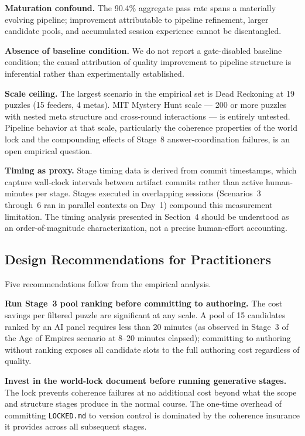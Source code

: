 \textbf{Maturation confound.} The 90.4\% aggregate pass rate spans a materially evolving pipeline; improvement attributable to pipeline refinement, larger candidate pools, and accumulated session experience cannot be disentangled.

\textbf{Absence of baseline condition.} We do not report a gate-disabled baseline condition; the causal attribution of quality improvement to pipeline structure is inferential rather than experimentally established.

\textbf{Scale ceiling.} The largest scenario in the empirical set is Dead Reckoning at 19 puzzles (15 feeders, 4 metas). MIT Mystery Hunt scale — 200 or more puzzles with nested meta structure and cross-round interactions — is entirely untested. Pipeline behavior at that scale, particularly the coherence properties of the world lock and the compounding effects of Stage~8 answer-coordination failures, is an open empirical question.

\textbf{Timing as proxy.} Stage timing data is derived from commit timestamps, which capture wall-clock intervals between artifact commits rather than active human-minutes per stage. Stages executed in overlapping sessions (Scenarios~3 through~6 ran in parallel contexts on Day~1) compound this measurement limitation. The timing analysis presented in Section~4 should be understood as an order-of-magnitude characterization, not a precise human-effort accounting.

\subsection{Design Recommendations for Practitioners}

Five recommendations follow from the empirical analysis.

\textbf{Run Stage~3 pool ranking before committing to authoring.} The cost savings per filtered puzzle are significant at any scale. A pool of 15 candidates ranked by an AI panel requires less than 20 minutes (as observed in Stage~3 of the Age of Empires scenario at 8–20 minutes elapsed); committing to authoring without ranking exposes all candidate slots to the full authoring cost regardless of quality.

\textbf{Invest in the world-lock document before running generative stages.} The lock prevents coherence failures at no additional cost beyond what the scope and structure stages produce in the normal course. The one-time overhead of committing \texttt{LOCKED.md} to version control is dominated by the coherence insurance it provides across all subsequent stages.

